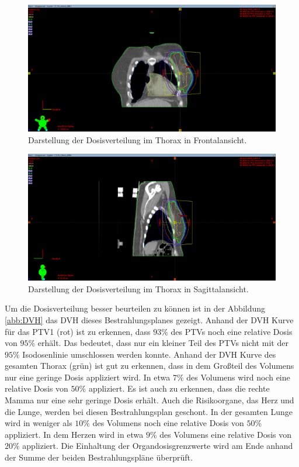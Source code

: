 \begin{figure}[H]
  \centering
  \includegraphics[width=\textwidth]{Bilder/Mamma1_Y.png}
  \caption{Darstellung der Dosisverteilung im Thorax in Frontalansicht.}
  \label{abb:Y1}
\end{figure}

\begin{figure}[H]
  \centering
  \includegraphics[width=\textwidth]{Bilder/Mamma1_X.png}
  \caption{Darstellung der Dosisverteilung im Thorax in Sagittalansicht.}
  \label{abb:X1}
\end{figure}


Um die Dosisverteilung besser beurteilen zu können ist in der Abbildung \ref{abb:DVH}
das DVH dieses Bestrahlungsplanes gezeigt. Anhand der DVH Kurve für das PTV1 (rot) ist
zu erkennen, dass $93\%$ des PTVs noch eine relative Dosis von $95\%$ erhält. Das bedeutet,
dass nur ein kleiner Teil des PTVs nicht mit der $95\%$ Isodosenlinie umschlossen werden konnte.
Anhand der DVH Kurve des gesamten Thorax (grün) ist gut zu erkennen, dass in dem Großteil des Volumens
nur eine geringe Dosis appliziert wird. In etwa $7\%$ des Volumens wird noch eine
relative Dosis von $50\%$ appliziert. Es ist auch zu erkennen, dass die rechte Mamma nur eine sehr geringe
Dosis erhält. Auch die Risikoorgane, das Herz und die Lunge, werden bei diesen Bestrahlungsplan
geschont. In der gesamten Lunge wird in weniger als $10\%$ des Volumens noch eine relative Dosis von $50\%$
appliziert. In dem Herzen wird in etwa $9\%$ des Volumens eine relative Dosis von $20\%$ appliziert.
Die Einhaltung der Organdosisgrenzwerte wird am Ende anhand der Summe der beiden Bestrahlungspläne überprüft.

